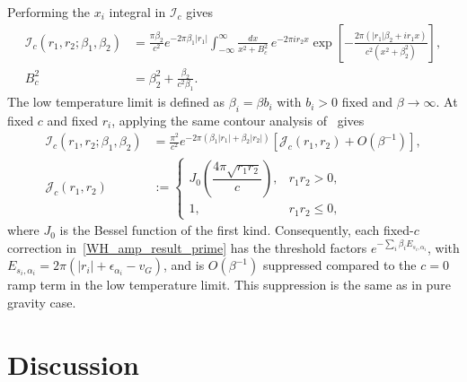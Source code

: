 \documentclass[11pt]{article}
\numberwithin{equation}{section}
\begin{document}
Performing the $x_i$ integral in  $\mathcal I_c$  gives~\cite{Cotler:2020ugk}
\begin{equation}
\begin{aligned}
 \mathcal I_c(r_1,r_2;\beta_1,\beta_2)
 &=\frac{\pi\beta_2}{c^2}e^{-2\pi\beta_1|r_1|}
   \int_{-\infty}^{\infty}\frac{dx}{x^2+B_c^2}\,
   e^{-2\pi i r_2x}
   \exp\!\left[-\frac{2\pi(|r_1|\beta_2+i r_1x)}
   {c^2(x^2+\beta_2^2)}\right],\\
 B_c^2&=\beta_2^2+\frac{\beta_2}{c^2\beta_1}.
\end{aligned}
\label{eq:continuous-one-dimensional-integral}
\end{equation}
The low temperature limit is defined as 
 $\beta_i=\beta b_i$ with $b_i>0$ fixed and $\beta\to\infty$. At fixed $c$ and fixed $r_i$, applying the same contour analysis of~\cite{Cotler:2020ugk} gives
\begin{equation}
\begin{aligned}
 \mathcal I_c(r_1,r_2;\beta_1,\beta_2)
 &=\frac{\pi^2}{c^2}
   e^{-2\pi(\beta_1|r_1|+\beta_2|r_2|)}
   \left[\mathcal J_c(r_1,r_2)+O(\beta^{-1})\right],\\
 \mathcal J_c(r_1,r_2)
 &:=\begin{cases}
 J_0\!\left(\dfrac{4\pi\sqrt{r_1r_2}}{c}\right),&r_1r_2>0,\\
 1,&r_1r_2\le0,
 \end{cases}
\end{aligned}
\label{eq:continuous-low-temperature}
\end{equation}
where $J_0$ is the Bessel function of the first kind. Consequently, each fixed-$c$ correction in~\eqref{WH_amp_result_prime} has the threshold factors $e^{-\sum_i\beta_i E_{s_i,\alpha_i}}$, with $E_{s_i,\alpha_i}=2\pi(|r_i|+\epsilon_{\alpha_i}-v_G)$, and is $O(\beta^{-1})$ suppressed compared to the $c=0$ ramp term in the low temperature limit. This suppression is the same as in pure gravity case.

\section{Discussion}
\label{S:discuss}
\end{document}
